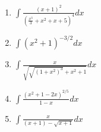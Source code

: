 {\begin{multicols}{2}
\begin{enumerate}
\item $\displaystyle\int \frac{(x+1)^2}{(\frac{x^3}{3}+x^2+x+5)^4} dx $
\item $\displaystyle\int (x^2+1)^{-3/2} dx $
\item $\displaystyle\int \frac{x}{\sqrt{\sqrt{(1+x^2)^3}+x^2+1}} dx $
\item $\displaystyle\int \frac{(x^2+1-2x)^{2/5}}{1-x} dx $
\item $\displaystyle\int \frac{x}{(x+1)-\sqrt{x+1}} dx $
\end{enumerate}
\end{multicols} 
%
}
